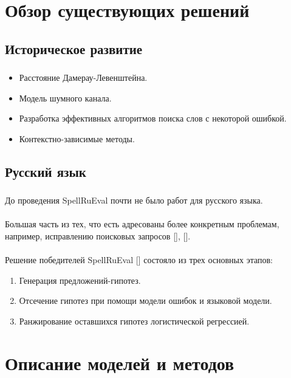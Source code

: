 \documentclass[t, aspectratio=169]{beamer}  %
\begin{document}
\section{Обзор существующих решений}
\subsection{Историческое развитие}
\begin{frame}
	\frametitle{\insertsection} 
	\framesubtitle{\insertsubsection}
	\begin{itemize}
		\item Расстояние Дамерау-Левенштейна.
		\item Модель шумного канала.
		\item Разработка эффективных алгоритмов поиска слов с некоторой ошибкой.
		\item Контекстно-зависимые методы.
	\end{itemize}
\end{frame}

\subsection{Русский язык}
\begin{frame}
	\frametitle{\insertsection} 
	\framesubtitle{\insertsubsection}
	До проведения SpellRuEval почти не было работ для русского языка.  \\~\\
	
	Большая часть из тех, что есть адресованы более конкретным проблемам, например, исправлению поисковых запросов [\textcite{Bajtin2008}], [\textcite{Panina2013}].  \\~\\
	
	Решение победителей SpellRuEval [\textcite{Sorokin2016}] состояло из трех основных этапов:
	\begin{enumerate}
		\item Генерация предложений-гипотез.
		\item Отсечение гипотез при помощи модели ошибок и языковой модели.
		\item Ранжирование оставшихся гипотез логистической регрессией.
	\end{enumerate}
\end{frame}

\section{Описание моделей и методов}
\end{document}
